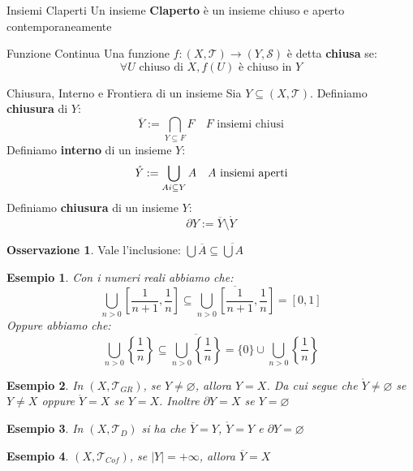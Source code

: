 \documentclass[11pt,a4paper,twoside]{article}
\newtheorem{es}{Esempio}
\theoremstyle{definition}
\newtheorem*{oss}{Osservazione}
\begin{document}
\begin{defn}{Insiemi Claperti}{}
	Un insieme \textbf{Claperto} è un insieme chiuso e aperto contemporaneamente
\end{defn}

\begin{defn}{Funzione Continua}{}
	Una funzione $f: (X, \mathcal T)\to (Y, \mathcal S)$ è detta \textbf{chiusa} se:
	\[ \forall U \text{ chiuso di }X, f(U) \text{ è chiuso in }Y\]
\end{defn}

\begin{defn}{Chiusura, Interno e Frontiera di un insieme}{}
	Sia $Y\subseteq (X, \mathcal T)$. Definiamo \textbf{chiusura} di $Y$:
	\[\overline Y := \bigcap_{Y \subseteq F}F \quad F \text{ insiemi chiusi}\]
	Definiamo \textbf{interno} di un insieme $Y$:
	\[\text{\textit{\r Y}}:= \bigcup_{A i\subseteq Y} A\quad A \text{ insiemi aperti}\]
	Definiamo \textbf{chiusura} di un insieme $Y$:
	\[\partial Y := \overline Y \setminus \mathring Y\]
\end{defn}

\begin{oss}
	Vale l'inclusione: $\bigcup \overline A \subseteq \overline{\bigcup A}$
\end{oss}

\begin{es}
	Con i numeri reali abbiamo che:
	\[\bigcup_{n>0} \left[\frac 1{n+1}, \frac 1{n}\right] \subseteq \overline{\bigcup_{n>0}\left[ \frac 1{n+1}, \frac 1n \right]} = [0,1] \]
	Oppure abbiamo che:
	\[ \bigcup_{n>0}\left\{ \frac 1n \right\} \subseteq \overline{\bigcup_{n>0} \left\{ \frac 1n \right\}} = \{0\} \cup \bigcup_{n>0}\left\{ \frac 1n \right\} \]
\end{es}

\begin{es}
	In $(X, \mathcal T_{GR})$, se $Y \neq \varnothing$, allora $Y = X$. Da cui segue che $\mathring Y \neq \varnothing$ se $Y\neq X$ oppure $\mathring Y = X$ se $Y = X$. Inoltre $\partial Y = X$ se $Y= \varnothing$
\end{es}

\begin{es}
	In $(X, \mathcal T_D)$ si ha che $\overline Y = Y$, $\mathring Y = Y$ e $\partial Y = \varnothing$
\end{es}

\begin{es}
	$(X, \mathcal T_{Cof})$, se $|Y| = +\infty$, allora $\overline Y = X$
\end{es}
\end{document}
